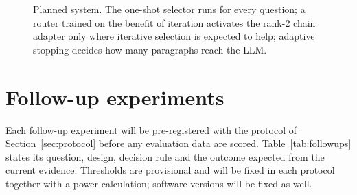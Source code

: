 \begin{figure}[htbp]
\centering
\resizebox{\textwidth}{!}{}
\caption{Planned system. The one-shot selector runs for every question; a router trained on the benefit of iteration activates the rank-2 chain adapter only where iterative selection is expected to help; adaptive stopping decides how many paragraphs reach the LLM.}
\label{fig:pipeline}
\end{figure}

\section{Follow-up experiments}
\label{sec:followups}

Each follow-up experiment will be pre-registered with the protocol of Section~\ref{sec:protocol} before any evaluation data are scored. Table~\ref{tab:followups} states its question, design, decision rule and the outcome expected from the current evidence. Thresholds are provisional and will be fixed in each protocol together with a power calculation; software versions will be fixed as well.

